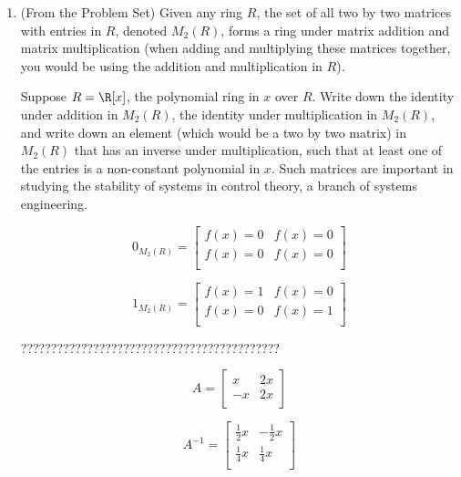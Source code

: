 \documentclass[letterpaper]{article}
\begin{document}
\begin{enumerate}
\[
\begin{array}{rcl}
j:(\R^2,+) &\to& (\R,+)\\
(x,y) &\mapsto& 2x+y
\end{array}
\]

\textbf{Claim: }$j$ is a homomorphism.
\begin{proof}
\[
\begin{array}{rcl}
j:((x_1,y_1)+(x_2,y_2)) &=& j:(x_1+x_2,y_1+y_2)\\
&=& 2(x_1+x_2)-(y_1+y_2)\\
&=& 2x_1+2x_2-y_1-y_2\\
&=& (2x_1-y_1)+(2x_2-y_2)\\
&=& j:(x_1,y_1)+j(x_2,y_2)\\
\end{array}
\]
\end{proof}
\textbf{Kernel:} $\ker(j)=\{(x,y):y=2x\}$\\
\textbf{Image:} $\image(j)=\R$. 

\setcounter{enumi}{2}
\item (From the Problem Set) Given any ring $R$, the set of all two by two matrices with entries in $R$, denoted $M_2(R)$, forms a ring under matrix addition and matrix multiplication (when adding and multiplying these matrices together, you would be using the addition and multiplication in $R$). 

Suppose $R=\R[x]$, the polynomial ring in $x$ over $R$.  Write down the identity under addition in $M_2(R)$, the identity under multiplication in $M_2(R)$, and write down an element (which would be a two by two matrix) in $M_2(R)$ that has an inverse under multiplication, such that at least one of the entries is a non-constant polynomial in $x$. Such matrices are important in studying the stability of systems in control theory, a branch of systems engineering.

\begin{example*}
\[
0_{M_2(R)}= 
\left[ \begin{array}{cc}
f(x)=0 & f(x)=0 \\
f(x)=0 & f(x)=0 \\
\end{array} \right]
\]

\[
1_{M_2(R)}= 
\left[ \begin{array}{cc}
f(x)=1 & f(x)=0 \\
f(x)=0 & f(x)=1 \\
\end{array} \right]
\]

???????????????????????????????????????????

\[
A= 
\left[ \begin{array}{cc}
x & 2x \\
-x & 2x \\
\end{array} \right]
\]

\[
A^{-1}= 
\left[ \begin{array}{cc}
\frac{1}{2}x & -\frac{1}{2}	x \\
\frac{1}{4}x & \frac{1}{4}x \\
\end{array} \right]
\]
\end{example*}

\end{enumerate}
\end{document}
